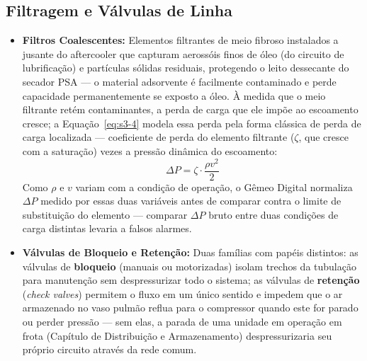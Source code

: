 \documentclass[12pt,a4paper]{article}
\numberwithin{equation}{section}
\numberwithin{table}{section}
\numberwithin{figure}{section}
\begin{document}
{	\subsection{\textbf{Filtragem e Válvulas de Linha}}
	\begin{itemize}
		\item \textbf{Filtros Coalescentes:} Elementos filtrantes de meio fibroso instalados a jusante do aftercooler que capturam aerossóis finos de óleo (do circuito de lubrificação) e partículas sólidas residuais, protegendo o leito dessecante do secador PSA — o material adsorvente é facilmente contaminado e perde capacidade permanentemente se exposto a óleo. À medida que o meio filtrante retém contaminantes, a perda de carga que ele impõe ao escoamento cresce; a Equação~\eqref{eq:s3-4} modela essa perda pela forma clássica de perda de carga localizada — coeficiente de perda do elemento filtrante ($\zeta$, que cresce com a saturação) vezes a pressão dinâmica do escoamento:
		\begin{equation}\label{eq:s3-4}
 \Delta P = \zeta \cdot \frac{\rho v^2}{2}
\end{equation}
		Como $\rho$ e $v$ variam com a condição de operação, o Gêmeo Digital normaliza $\Delta P$ medido por essas duas variáveis antes de comparar contra o limite de substituição do elemento — comparar $\Delta P$ bruto entre duas condições de carga distintas levaria a falsos alarmes.
		\item \textbf{Válvulas de Bloqueio e Retenção:} Duas famílias com papéis distintos: as válvulas de \textbf{bloqueio} (manuais ou motorizadas) isolam trechos da tubulação para manutenção sem despressurizar todo o sistema; as válvulas de \textbf{retenção} (\textit{check valves}) permitem o fluxo em um único sentido e impedem que o ar armazenado no vaso pulmão reflua para o compressor quando este for parado ou perder pressão — sem elas, a parada de uma unidade em operação em frota (Capítulo de Distribuição e Armazenamento) despressurizaria seu próprio circuito através da rede comum.
	\end{itemize}
	
}
\end{document}
